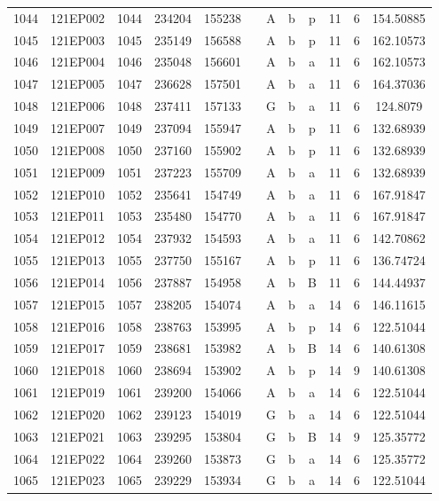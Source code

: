 \begin{tabular}{|*{12}{c|}}
1044 & 121EP002 & 1044 & 234204 & 155238 &  & A & b & p & 11 & 6 & 154.50885 \\ 
1045 & 121EP003 & 1045 & 235149 & 156588 &  & A & b & p & 11 & 6 & 162.10573 \\ 
1046 & 121EP004 & 1046 & 235048 & 156601 &  & A & b & a & 11 & 6 & 162.10573 \\ 
1047 & 121EP005 & 1047 & 236628 & 157501 &  & A & b & a & 11 & 6 & 164.37036 \\ 
1048 & 121EP006 & 1048 & 237411 & 157133 &  & G & b & a & 11 & 6 & 124.8079 \\ 
1049 & 121EP007 & 1049 & 237094 & 155947 &  & A & b & p & 11 & 6 & 132.68939 \\ 
1050 & 121EP008 & 1050 & 237160 & 155902 &  & A & b & p & 11 & 6 & 132.68939 \\ 
1051 & 121EP009 & 1051 & 237223 & 155709 &  & A & b & a & 11 & 6 & 132.68939 \\ 
1052 & 121EP010 & 1052 & 235641 & 154749 &  & A & b & a & 11 & 6 & 167.91847 \\ 
1053 & 121EP011 & 1053 & 235480 & 154770 &  & A & b & a & 11 & 6 & 167.91847 \\ 
1054 & 121EP012 & 1054 & 237932 & 154593 &  & A & b & a & 11 & 6 & 142.70862 \\ 
1055 & 121EP013 & 1055 & 237750 & 155167 &  & A & b & p & 11 & 6 & 136.74724 \\ 
1056 & 121EP014 & 1056 & 237887 & 154958 &  & A & b & B & 11 & 6 & 144.44937 \\ 
1057 & 121EP015 & 1057 & 238205 & 154074 &  & A & b & a & 14 & 6 & 146.11615 \\ 
1058 & 121EP016 & 1058 & 238763 & 153995 &  & A & b & p & 14 & 6 & 122.51044 \\ 
1059 & 121EP017 & 1059 & 238681 & 153982 &  & A & b & B & 14 & 6 & 140.61308 \\ 
1060 & 121EP018 & 1060 & 238694 & 153902 &  & A & b & p & 14 & 9 & 140.61308 \\ 
1061 & 121EP019 & 1061 & 239200 & 154066 &  & A & b & a & 14 & 6 & 122.51044 \\ 
1062 & 121EP020 & 1062 & 239123 & 154019 &  & G & b & a & 14 & 6 & 122.51044 \\ 
1063 & 121EP021 & 1063 & 239295 & 153804 &  & G & b & B & 14 & 9 & 125.35772 \\ 
1064 & 121EP022 & 1064 & 239260 & 153873 &  & G & b & a & 14 & 6 & 125.35772 \\ 
1065 & 121EP023 & 1065 & 239229 & 153934 &  & G & b & a & 14 & 6 & 122.51044 \\ 

\end{tabular}
